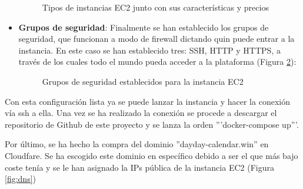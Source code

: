 \begin{itemize}
\begin{figure}[H]
        \caption{Tipos de instancias EC2 junto con sus características y precios}
        \label{fig:ec2-types}
    \end{figure}
    \item \textbf{Grupos de seguridad}: Finalmente se han establecido los grupos de seguridad, que funcionan a modo de firewall dictando quin puede entrar a la instancia. En este caso se han establecido tres: SSH, HTTP y HTTPS, a través de los cuales todo el mundo pueda acceder a la plataforma (Figura \ref{fig:ec2-security}):
    \begin{figure}[H]
        \caption{Grupos de seguridad establecidos para la instancia EC2}
        \label{fig:ec2-security}
    \end{figure}
\end{itemize}

Con esta configuración lista ya se puede lanzar la instancia y hacer la conexión vía ssh a ella. Una vez se ha realizado la conexión se procede a descargar el repositorio de Github de este proyecto y se lanza la orden '''docker-compose up'''.  \bigskip

Por último, se ha hecho la compra del dominio ''dayday-calendar.win'' en Cloudfare. Se ha escogido este dominio en específico debido a ser el que más bajo coste tenía y se le han asignado la IPs pública de la instancia EC2 (Figura \ref{fig:dns})

